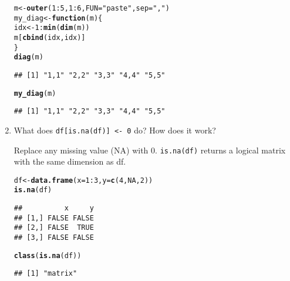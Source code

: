 \documentclass{article}\usepackage[]{graphicx}\usepackage[]{color}
\makeatletter
\newcommand{\hlnum}[1]{\textcolor[rgb]{0.686,0.059,0.569}{#1}}%
\newcommand{\hlstr}[1]{\textcolor[rgb]{0.192,0.494,0.8}{#1}}%
\newcommand{\hlopt}[1]{\textcolor[rgb]{0,0,0}{#1}}%
\newcommand{\hlstd}[1]{\textcolor[rgb]{0.345,0.345,0.345}{#1}}%
\newcommand{\hlkwa}[1]{\textcolor[rgb]{0.161,0.373,0.58}{\textbf{#1}}}%
\newcommand{\hlkwb}[1]{\textcolor[rgb]{0.69,0.353,0.396}{#1}}%
\newcommand{\hlkwc}[1]{\textcolor[rgb]{0.333,0.667,0.333}{#1}}%
\newcommand{\hlkwd}[1]{\textcolor[rgb]{0.737,0.353,0.396}{\textbf{#1}}}%
\newenvironment{kframe}{%
 \def\at@end@of@kframe{}%
 \ifinner\ifhmode%
  \def\at@end@of@kframe{\end{minipage}}%
  \begin{minipage}{\columnwidth}%
 \fi\fi%
 \def\FrameCommand##1{\hskip\@totalleftmargin \hskip-\fboxsep
 \colorbox{shadecolor}{##1}\hskip-\fboxsep
     \hskip-\linewidth \hskip-\@totalleftmargin \hskip\columnwidth}%
 \MakeFramed {\advance\hsize-\width
   \@totalleftmargin\z@ \linewidth\hsize
   \@setminipage}}%
 {\par\unskip\endMakeFramed%
 \at@end@of@kframe}
\newenvironment{knitrout}{}{} %
\makeatother
\begin{document}
\begin{enumerate}
\begin{knitrout}
\color{fgcolor}\begin{kframe}
\begin{alltt}
\hlstd{m} \hlkwb{<-} \hlkwd{outer}\hlstd{(}\hlnum{1}\hlopt{:}\hlnum{5}\hlstd{,} \hlnum{1}\hlopt{:}\hlnum{6}\hlstd{,} \hlkwc{FUN}\hlstd{=}\hlstr{"paste"}\hlstd{,} \hlkwc{sep}\hlstd{=}\hlstr{","}\hlstd{)}
\hlstd{my_diag} \hlkwb{<-} \hlkwa{function}\hlstd{(}\hlkwc{m}\hlstd{) \{}
  \hlstd{idx} \hlkwb{<-} \hlnum{1}\hlopt{:}\hlkwd{min}\hlstd{(}\hlkwd{dim}\hlstd{(m))}
  \hlstd{m[}\hlkwd{cbind}\hlstd{(idx, idx)]}
\hlstd{\}}
\hlkwd{diag}\hlstd{(m)}
\end{alltt}
\begin{verbatim}
## [1] "1,1" "2,2" "3,3" "4,4" "5,5"
\end{verbatim}
\begin{alltt}
\hlkwd{my_diag}\hlstd{(m)}
\end{alltt}
\begin{verbatim}
## [1] "1,1" "2,2" "3,3" "4,4" "5,5"
\end{verbatim}
\end{kframe}
\end{knitrout}

\item What does \verb`df[is.na(df)] <- 0` do? How does it work?

Replace any missing value (NA) with 0. \verb`is.na(df)` returns a logical matrix with the same dimension as df.

\begin{knitrout}
\color{fgcolor}\begin{kframe}
\begin{alltt}
\hlstd{df} \hlkwb{<-} \hlkwd{data.frame}\hlstd{(}\hlkwc{x}\hlstd{=}\hlnum{1}\hlopt{:}\hlnum{3}\hlstd{,} \hlkwc{y}\hlstd{=}\hlkwd{c}\hlstd{(}\hlnum{4}\hlstd{,}\hlnum{NA}\hlstd{,}\hlnum{2}\hlstd{))}
\hlkwd{is.na}\hlstd{(df)}
\end{alltt}
\begin{verbatim}
##          x     y
## [1,] FALSE FALSE
## [2,] FALSE  TRUE
## [3,] FALSE FALSE
\end{verbatim}
\begin{alltt}
\hlkwd{class}\hlstd{(}\hlkwd{is.na}\hlstd{(df))}
\end{alltt}
\begin{verbatim}
## [1] "matrix"
\end{verbatim}
\end{kframe}
\end{knitrout}
\end{enumerate}
\end{document}
